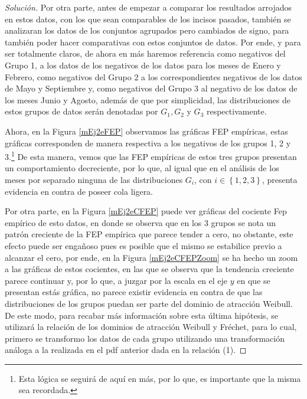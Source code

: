 \documentclass[10.5pt,notitlepage]{article}
\newenvironment{solucion}
  {\begin{proof}[Solución]}
  {\end{proof}}
\newcommand{\kis}[1]{\left\{ #1 \right\}}
\theoremstyle{plain}
\begin{document}
\begin{solucion}
Por otra parte, antes de empezar a comparar los resultados arrojados en estos datos, con los que sean comparables de los incisos pasados, también se analizaran los datos de los conjuntos agrupados pero cambiados de signo, para también poder hacer comparativas con estos conjuntos de datos. 
Por ende, y para ser totalmente claros, de ahora en más haremos referencia como negativos del Grupo 1, a los datos de los negativos de los datos para los meses de Enero y Febrero, como negativos del Grupo 2 a los correspondientes negativos de los datos de Mayo y Septiembre y, como negativos del Grupo 3 al negativo de los datos de los meses Junio y Agosto, además de que por simplicidad, las distribuciones de estos grupos de datos serán denotadas por \(G_1, G_2\) y \(G_3\) respectivamente. 

Ahora, en la Figura \ref{mEj2eFEP} observamos las gráficas FEP empíricas, estas gráficas corresponden de manera respectiva a los negativos de los grupos 1, 2 y 3.\footnote{Esta lógica se seguirá de aquí en más, por lo que, es importante que la misma sea recordada.} De esta manera, vemos que las FEP empíricas de estos tres grupos presentan un comportamiento decreciente, por lo que, al igual que en el análisis de los meses por separado ninguna de las distribuciones \(G_i\), con \(i \in \kis{1,2,3}\), presenta evidencia en contra de poseer cola ligera. 

Por otra parte, en la Figura \ref{mEj2eCFEP} puede ver gráficas del cociente Fep empírico de esto datos, en donde se observa que en los 3 grupos se nota un patrón creciente de la FEP empírica que parece tender a cero, no obstante, este efecto puede ser engañoso pues es posible que el mismo se estabilice previo a alcanzar el cero, por ende, en la Figura \ref{mEj2eCFEPZoom} se ha hecho un zoom a las gráficas de estos cocientes, en las que se observa que la tendencia creciente parece continuar y, por lo que, a juzgar por la escala en el eje \(y\) en que se presentan estás gráfica, no parece existir evidencia en contra de que las distribuciones de los grupos puedan ser parte del dominio de atracción Weibull. De este modo, para recabar más información sobre esta última hipótesis, se utilizará la relación de los dominios de atracción Weibull y Fréchet, para lo cual, primero se transformo los datos de cada grupo utilizando una transformación análoga a la realizada en el pdf anterior dada en la relación (1).


\end{solucion}
\end{document}
